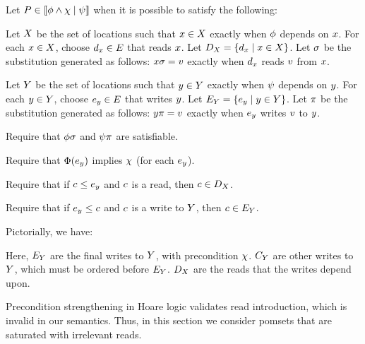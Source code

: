 \begin{definition}
  \label{def:prepost}
  Let $P\in\llbracket\phi\land\chi\mid\psi\rrbracket$
  when it is possible to satisfy the following:

  Let $X$ be the set of locations such that $x\in X$ exactly
  when $\phi$ depends on $x$.  For each $x\in X$, choose
  $d_x\in E$ that reads $x$.
  Let $D_X=\{d_x\mid x\in X\}$.
  Let $\sigma$ be the substitution generated %
  as follows:
  $x\sigma = v$ exactly when $d_x$ reads $v$ from $x$.

  Let $Y$ be the set of locations such that $y\in Y$ exactly
  when $\psi$ depends on $y$.  For each $y\in Y$, choose
  $e_y\in E$ that writes $y$.
  Let $E_Y=\{e_y\mid y\in Y\}$.
  Let $\pi$ be the substitution generated %
  as follows:
  $y\pi = v$ exactly when $e_y$ writes $v$ to $y$.

  Require that $\phi\sigma$ and $\psi\pi$ are satisfiable.

  Require that $\Phi(e_y)$ implies $\chi$ (for each $e_y$).
  
  Require that if $c\le e_y$ and $c$ is a read, then $c\in D_X$.

  Require that if $e_y\le c$ and $c$ is a write to $Y$, then $c\in E_Y$.
\end{definition}
Pictorially, we have:
\begin{tikzdisplay}[node distance=.1ex and 2em]
\end{tikzdisplay}
Here, $E_Y$ are the final writes to $Y$, with precondition $\chi$.
$C_Y$ are other writes to $Y$, which must be ordered before $E_Y$.
$D_X$ are the reads that the writes depend upon.

Precondition strengthening in Hoare logic validates read introduction, which
is invalid in our semantics.  Thus, in this section we consider pomsets that
are saturated with irrelevant reads.

